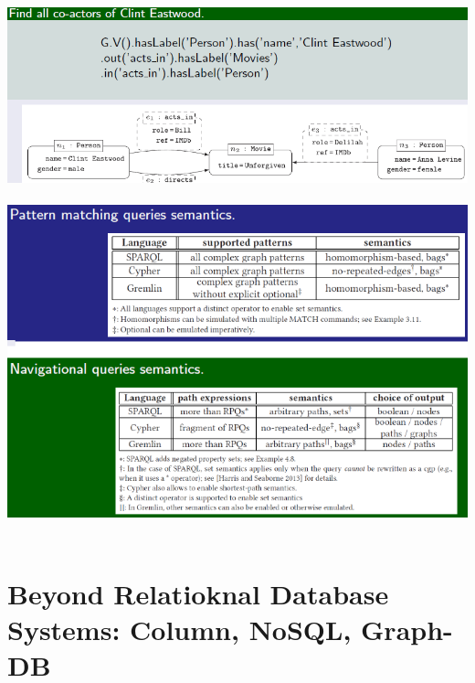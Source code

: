 \documentclass{article}
\begin{document}
\includegraphics[scale=0.6]{29.png}\\\\
\includegraphics[scale=0.6]{30.png}\\\\


\section{Beyond Relatioknal Database Systems: Column, NoSQL, Graph-DB}
\end{document}
